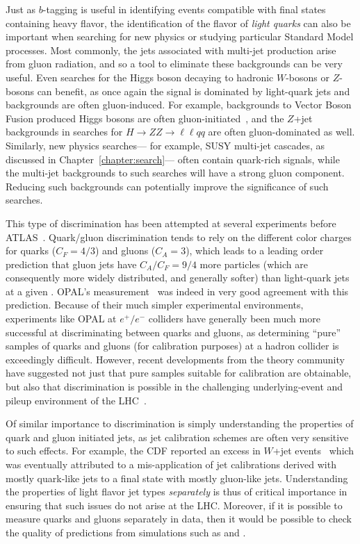 Just as $b$-tagging is useful in identifying events compatible with final states containing heavy flavor, the identification of the flavor of \textit{light quarks} can also be important when searching for new physics or studying particular Standard Model processes. Most commonly, the jets associated with multi-jet production arise from gluon radiation, and so a tool to eliminate these backgrounds can be very useful. Even searches for the Higgs boson decaying to hadronic $W$-bosons or $Z$-bosons can benefit, as once again the signal is dominated by light-quark jets and backgrounds are often gluon-induced. For example, backgrounds to Vector Boson Fusion produced Higgs bosons are often gluon-initiated~\cite{CMS-PAS-HIG-13-011}, and the $Z$+jet backgrounds in searches for $H\rightarrow ZZ \rightarrow \ell \ell qq$ are often gluon-dominated as well. Similarly, new physics searches--- for example, SUSY multi-jet cascades, as discussed in Chapter~\ref{chapter:search}--- often contain quark-rich signals, while the multi-jet backgrounds to such searches will have a strong gluon component. Reducing such backgrounds can potentially improve the significance of such searches.

This type of discrimination has been attempted at several experiments before ATLAS~\cite{TevatronShapes1,QGNN,Pumplin,QGopal,Ariel,QGsub,QGlep,QGcleo,DelphiQG,DelphiQG2,AlephQG,L3QG}. Quark/gluon discrimination tends to rely on the different color charges for quarks ($C_F=4/3$) and gluons ($C_A=3$), which leads to a leading order prediction that gluon jets have $C_A/C_F = 9/4$ more particles (which are consequently more widely distributed, and generally softer) than light-quark jets at a given \pt. OPAL's measurement~\cite{QGopal} was indeed in very good agreement with this prediction. Because of their much simpler experimental environments, experiments like OPAL at $e^+/e^-$ colliders have generally been much more successful at discriminating between quarks and gluons, as determining ``pure'' samples of quarks and gluons (for calibration purposes) at a hadron collider is exceedingly difficult. However, recent developments from the theory community have suggested not just that pure samples suitable for calibration are obtainable, but also that discrimination is possible in the challenging underlying-event and pileup environment of the LHC~\cite{schwartz1,schwartz2}. 

Of similar importance to discrimination is simply understanding the properties of quark and gluon initiated jets, as jet calibration schemes are often very sensitive to such effects. For example, the CDF reported an excess in $W$+jet events~\cite{Aaltonen:2011mk} which was eventually attributed to a mis-application of jet calibrations derived with mostly quark-like jets to a final state with mostly gluon-like jets. Understanding the properties of light flavor jet types \textit{separately} is thus of critical importance in ensuring that such issues do not arise at the LHC. Moreover, if it is possible to measure quarks and gluons separately in data, then it would be possible to check the quality of predictions from simulations such as \Pythia and \Herwigpp.

